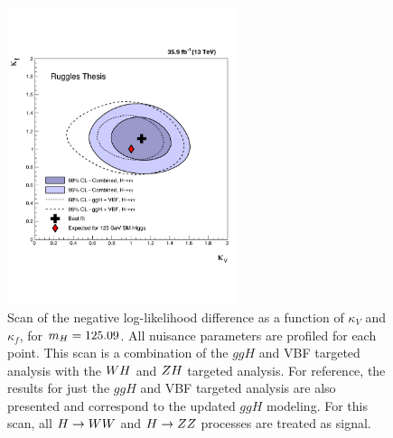 \begin{figure}[!ht]
 \begin{center}
  \includegraphics[width=0.60\textwidth]{higgs_to_taus_vh/plots/combined/kFkV_HIG-18-007_plus_HIG-16-043_comp_up2.pdf}
 \end{center}
 \caption{Scan of the negative 
 log-likelihood difference as a function of $\kappa_V$ and $\kappa_f$, for 
 $m_{H} = 125.09$\GeV.  All nuisance parameters are profiled for each point. 
 This scan is a combination of the $ggH$ and VBF targeted analysis with the 
 $WH$ and $ZH$ targeted analysis. For reference, the results for just
 the $ggH$ and VBF targeted analysis are also presented and correspond
 to the updated $ggH$ modeling.
 For this scan, all $H\to WW$ and $H\to ZZ$ processes 
 are treated as signal.
 }
 \label{fig:cmb_kFkV}
\end{figure}



\clearpage
